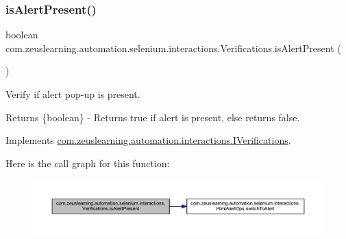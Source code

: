 \subsubsection{\texorpdfstring{is\+Alert\+Present()}{isAlertPresent()}}
{\footnotesize\ttfamily boolean com.\+zeuslearning.\+automation.\+selenium.\+interactions.\+Verifications.\+is\+Alert\+Present (\begin{DoxyParamCaption}{ }\end{DoxyParamCaption})\hspace{0.3cm}{\ttfamily [inline]}}

Verify if alert pop-\/up is present.

\begin{DoxyReturn}{Returns}
\{boolean\} -\/ Returns {\ttfamily true} if alert is present, else returns {\ttfamily false}. 
\end{DoxyReturn}


Implements \hyperlink{interfacecom_1_1zeuslearning_1_1automation_1_1interactions_1_1IVerifications_aec38d25880abb184e78864f6ac03a4e8}{com.\+zeuslearning.\+automation.\+interactions.\+I\+Verifications}.

Here is the call graph for this function\+:
\nopagebreak
\begin{figure}[H]
\begin{center}
\leavevmode
\includegraphics[width=350pt]{d2/d6b/classcom_1_1zeuslearning_1_1automation_1_1selenium_1_1interactions_1_1Verifications_a1719b6ad2358f7e080119d4cfa911ad8_cgraph}
\end{center}
\end{figure}
\hypertarget{classcom_1_1zeuslearning_1_1automation_1_1selenium_1_1interactions_1_1Verifications_a848b9875c187f2c7f5bbf6b78f7db58f}{}\label{classcom_1_1zeuslearning_1_1automation_1_1selenium_1_1interactions_1_1Verifications_a848b9875c187f2c7f5bbf6b78f7db58f} 

